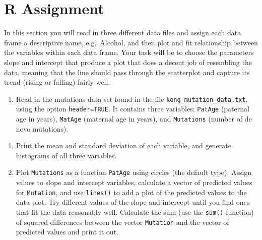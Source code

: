 \documentclass[
]{book}
\newenvironment{Shaded}{\begin{snugshade}}{\end{snugshade}}
\newcommand{\KeywordTok}[1]{\textcolor[rgb]{0.13,0.29,0.53}{\textbf{#1}}}
\newcommand{\NormalTok}[1]{#1}
\newcommand{\OperatorTok}[1]{\textcolor[rgb]{0.81,0.36,0.00}{\textbf{#1}}}
\providecommand{\tightlist}{%
  \setlength{\itemsep}{0pt}\setlength{\parskip}{0pt}}
\theoremstyle{definition}
\theoremstyle{definition}
\theoremstyle{definition}
\theoremstyle{remark}
\begin{document}
\begin{Shaded}
\end{Shaded}

\hypertarget{r-assignment-2}{%
\section{R Assignment}\label{r-assignment-2}}

In this section you will read in three different data files and assign each data frame a descriptive name, e.g.~Alcohol, and then plot and fit relationship between the variables within each data frame. Your task will be to choose the parameters slope and intercept that produce a plot that does a decent job of resembling the data, meaning that the line should pass through the scatterplot and capture its trend (rising or falling) fairly well.

\begin{enumerate}
\def\labelenumi{\arabic{enumi}.}
\tightlist
\item
  Read in the mutations data set found in the file \texttt{kong\_mutation\_data.txt}, using the option \texttt{header=TRUE}. It contains three variables: \texttt{PatAge} (paternal age in years), \texttt{MatAge} (maternal age in years), and \texttt{Mutations} (number of de novo mutations).
\end{enumerate}

\begin{enumerate}
\def\labelenumi{\alph{enumi})}
\item
  Print the mean and standard deviation of each variable, and generate histograms of all three variables.
\item
  Plot \texttt{Mutations} as a function \texttt{PatAge} using circles (the default type). Assign values to slope and intercept variables, calculate a vector of predicted values for \texttt{Mutation}, and use \texttt{lines()} to add a plot of the predicted values to the data plot. Try different values of the slope and intercept until you find ones that fit the data reasonably well. Calculate the sum (use the \texttt{sum()} function) of squared differences between the vector \texttt{Mutation} and the vector of predicted values and print it out.
\end{enumerate}
\end{document}
